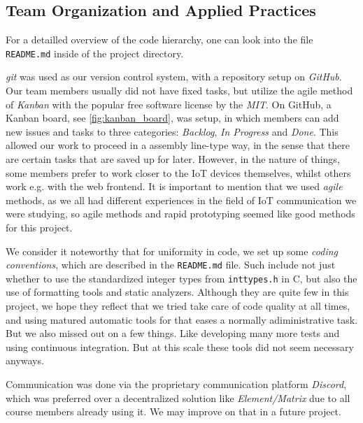 \documentclass[acmtog, language=english, nonacm]{acmart}
\begin{document}
    \subsection{Team Organization and Applied Practices}

    For a detailled overview of the code hierarchy, one can look into the file \texttt{README.md} inside of the project directory.
    
    \emph{git} was used as our version control system, with a repository setup on \emph{GitHub}. Our team members usually did not have fixed tasks, but utilize the agile method of \emph{Kanban} with the popular free software license by the \emph{MIT}. On GitHub, a Kanban board, see \cref{fig:kanban_board}, was setup, in which members can add new issues and tasks to three categories: \emph{Backlog}, \emph{In Progress} and \emph{Done}. This allowed our work to proceed in a assembly line-type way, in the sense that there are certain tasks that are saved up for later. However, in the nature of things, some members prefer to work closer to the IoT devices themselves, whilst others work e.g. with the web frontend. It is important to mention that we used \emph{agile} methods, as we all had different experiences in the field of IoT communication we were studying, so agile methods and rapid prototyping seemed like good methods for this project.

    We consider it noteworthy that for uniformity in code, we set up some \emph{coding conventions}, which are described in the \texttt{README.md} file. Such include not just whether to use the standardized integer types from \texttt{inttypes.h} in C, but also the use of formatting tools and static analyzers. Although they are quite few in this project, we hope they reflect that we tried take care of code quality at all times, and using matured automatic tools for that eases a normally adiministrative task. But we also missed out on a few things. Like developing many more tests and using continuous integration. But at this scale these tools did not seem necessary anyways.

    Communication was done via the proprietary communication platform \emph{Discord}, which was preferred over a decentralized solution like \emph{Element/Matrix} due to all course members already using it. We may improve on that in a future project.
\end{document}
